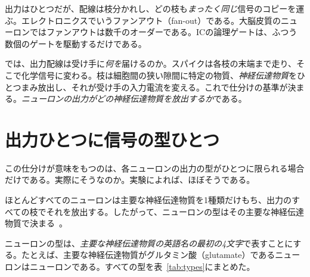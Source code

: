 出力はひとつだが、配線は枝分かれし、どの枝も\emph{まったく同じ}信号のコピーを運ぶ。エレクトロニクスでいうファンアウト（fan-out）である。大脳皮質のニューロンではファンアウトは数千のオーダーである。ICの論理ゲートは、ふつう数個のゲートを駆動するだけである。

では、出力配線は受け手に\emph{何を}届けるのか。スパイクは各枝の末端まで走り、そこで化学信号に変わる。枝は細胞間の狭い隙間に特定の物質、\emph{神経伝達物質}をひとつまみ放出し、それが受け手の入力電流を変える。これで仕分けの基準が決まる。\emph{ニューロンの出力がどの神経伝達物質を放出するか}である。

\section{出力ひとつに信号の型ひとつ}

この仕分けが意味をもつのは、各ニューロンの出力の型がひとつに限られる場合だけである。実際にそうなのか。実験によれば、ほぼそうである。

\begin{keyblock}
\begin{proposition}
\label{prop:dale}
ほとんどすべてのニューロンは主要な神経伝達物質を1種類だけもち、出力のすべての枝でそれを放出する。したがって、ニューロンの型はその主要な神経伝達物質で決まる~\cite{Strata1999}。
\end{proposition}
\end{keyblock}

ニューロンの型は、\emph{主要な神経伝達物質の英語名の最初の4文字}で表すことにする。たとえば、主要な神経伝達物質がグルタミン酸（glutamate）であるニューロンはニューロンである。すべての型を表~\ref{tab:types}にまとめた。

